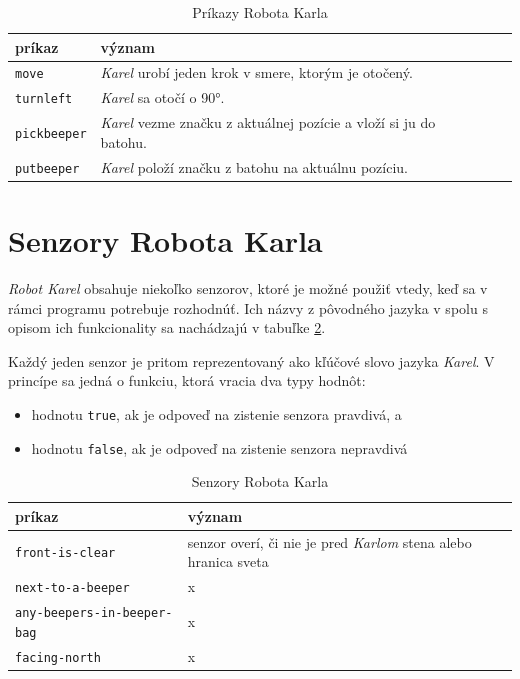 \begin{table}[!ht]
	\caption{Príkazy Robota Karla}\label{tab:karels_primitives}
	\smallskip
	\centering

	\begin{tabular}{llll}
		\toprule
		príkaz & význam \\
		\midrule

		\verb|move| & \emph{Karel} urobí jeden krok v smere, ktorým je otočený. \\
		\verb|turnleft| & \emph{Karel} sa otočí o 90°. \\
		\verb|pickbeeper| & \emph{Karel} vezme značku z aktuálnej pozície a vloží si ju do batohu. \\
		\verb|putbeeper| & \emph{Karel} položí značku z batohu na aktuálnu pozíciu. \\
		\bottomrule
	\end{tabular}
\end{table}


\section{Senzory Robota Karla}

\emph{Robot Karel} obsahuje niekoľko senzorov, ktoré je možné použiť vtedy, keď sa v rámci programu potrebuje rozhodnúť. Ich názvy z pôvodného jazyka v \cite{Pattis1994} spolu s opisom ich funkcionality sa nachádzajú v tabuľke \ref{tab:karels_sensors}.

Každý jeden senzor je pritom reprezentovaný ako kľúčové slovo jazyka \emph{Karel}. V princípe sa jedná o funkciu, ktorá vracia dva typy hodnôt:

\begin{itemize}
    \item hodnotu \verb|true|, ak je odpoveď na zistenie senzora pravdivá, a
    \item hodnotu \verb|false|, ak je odpoveď na zistenie senzora nepravdivá
\end{itemize}

\begin{table}[!ht]
	\caption{Senzory Robota Karla}\label{tab:karels_sensors}
	\smallskip
	\centering

   \begin{tabular}{l|p{80mm}}
		\toprule
		príkaz & význam \\
		\midrule

		\verb|front-is-clear| & senzor overí, či nie je pred \emph{Karlom} stena alebo hranica sveta \\
		\verb|next-to-a-beeper| & x \\
		\verb|any-beepers-in-beeper-bag| & x \\
		\verb|facing-north| & x \\
		\bottomrule
	\end{tabular}
\end{table}

